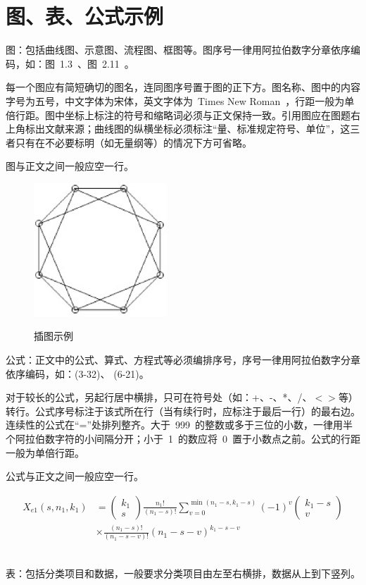 
\chapter{图、表、公式示例}

图：包括曲线图、示意图、流程图、框图等。图序号一律用阿拉伯数字分章依序编码，如：图~1.3~、图~2.11~。

每一个图应有简短确切的图名，连同图序号置于图的正下方。图名称、图中的内容字号为五号，中文字体为宋体，英文字体为~Times New Roman~，行距一般为单倍行距。图中坐标上标注的符号和缩略词必须与正文保持一致。引用图应在图题右上角标出文献来源；曲线图的纵横坐标必须标注“量、标准规定符号、单位”，这三者只有在不必要标明（如无量纲等）的情况下方可省略。

图与正文之间一般应空一行。

\begin{figure}[!h]
  \centering
  \includegraphics[height=5cm ,width=5cm]{figures/fig.eps}\\
\caption{插图示例}
\end{figure}

公式：正文中的公式、算式、方程式等必须编排序号，序号一律用阿拉伯数字分章依序编码，如：(3-32)、 (6-21)。

对于较长的公式，另起行居中横排，只可在符号处（如：+、-、*、/、$<$$>$等）转行。公式序号标注于该式所在行（当有续行时，应标注于最后一行）的最右边。连续性的公式在“=”处排列整齐。大于~999~的整数或多于三位的小数，一律用半个阿拉伯数字符的小间隔分开；小于~1~的数应将~0~置于小数点之前。公式的行距一般为单倍行距。

公式与正文之间一般应空一行。

\begin{equation}
\begin{split}
{X_{e1}}\left( {s,{n_1},{k_1}} \right) &= \left( {\begin{array}{*{20}{c}}
{{k_1}}\\
s
\end{array}} \right)\frac{{{n_1}!}}{{\left( {{n_1} - s} \right)!}}\sum\nolimits_{v = 0}^{\min \left( {{n_1} - s,{k_1} - s} \right)} {{{\left( { - 1} \right)}^v}\left( {\begin{array}{*{20}{c}}
{{k_1} - s}\\
v
\end{array}} \right)} \\
& \times \frac{{\left( {{n_1} - s} \right)!}}{{\left( {{n_1} - s - v} \right)!}}{\left( {{n_1} - s - v} \right)^{{k_1} - s - v}}
\end{split}
\end{equation}
~\par
表：包括分类项目和数据，一般要求分类项目由左至右横排，数据从上到下竖列。

